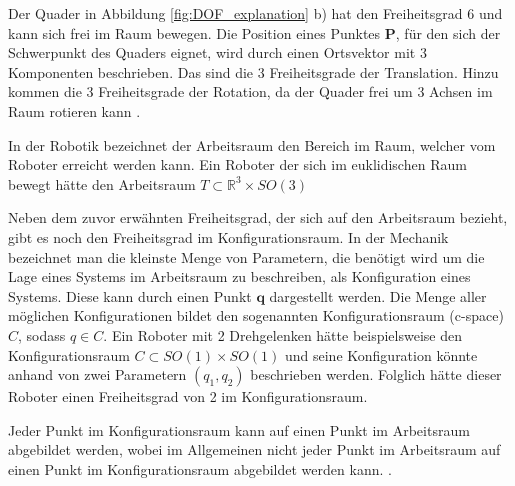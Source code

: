 Der Quader in Abbildung \ref{fig:DOF_explanation} b) hat den Freiheitsgrad 6 und kann sich frei im Raum bewegen.
Die Position eines Punktes $\mathbf{P}$, für den sich der Schwerpunkt des Quaders eignet, wird durch einen Ortsvektor mit 3 Komponenten beschrieben.
Das sind die 3 Freiheitsgrade der Translation. Hinzu kommen die 3 Freiheitsgrade der Rotation, da der Quader frei um 3 Achsen im Raum rotieren kann
.

In der Robotik bezeichnet der Arbeitsraum den Bereich im Raum, welcher vom Roboter erreicht werden kann.
Ein Roboter der sich im euklidischen Raum bewegt hätte den Arbeitsraum $T \subset \mathbb{R}^3 \times SO(3)$

Neben dem zuvor erwähnten Freiheitsgrad, der sich auf den Arbeitsraum bezieht, gibt es noch den Freiheitsgrad im Konfigurationsraum.
In der Mechanik bezeichnet man die kleinste Menge von Parametern, die benötigt wird um die Lage eines Systems im Arbeitsraum zu beschreiben,
als Konfiguration eines Systems. Diese kann durch einen Punkt $\mathbf{q}$ dargestellt werden.
Die Menge aller möglichen Konfigurationen bildet den sogenannten Konfigurationsraum (c-space) $C$, sodass $q \in C$.
Ein Roboter mit 2 Drehgelenken hätte beispielsweise den Konfigurationsraum $C \subset SO(1) \times SO(1)$ und seine Konfiguration könnte anhand von zwei Parametern $(q_1,q_2)$ beschrieben werden.
Folglich hätte dieser Roboter einen Freiheitsgrad von 2 im Konfigurationsraum.

Jeder Punkt im Konfigurationsraum kann auf einen Punkt im Arbeitsraum abgebildet werden, wobei im Allgemeinen nicht jeder Punkt im Arbeitsraum auf einen Punkt im Konfigurationsraum abgebildet werden kann.
.



